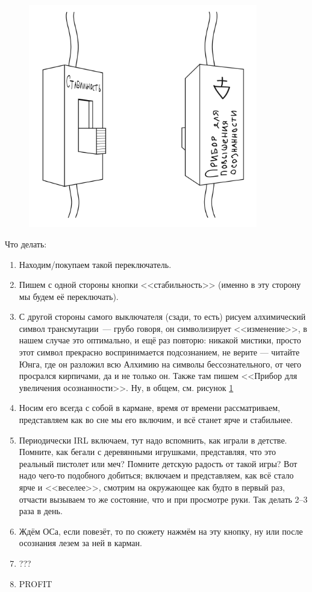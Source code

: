 \documentclass[a5paper,12pt,twoside]{memoir}
\begin{document}
\begin{figure}[h!]

\begin{center}
\includegraphics[width=10cm]{ris111.png}
\end{center}
\caption{}
\label{sitem}
\end{figure}

\clearpage

Что делать:
\begin{enumerate}
\item Находим/покупаем такой переключатель.
\item Пишем с одной стороны кнопки <<стабильность>> (именно в эту сторону мы будем её переключать).
\item С другой стороны самого выключателя (сзади, то есть) рисуем алхимический символ трансмутации~--- грубо говоря, он символизирует <<изменение>>, в нашем случае это оптимально, и ещё раз повторю: никакой мистики, просто этот символ прекрасно воспринимается подсознанием, не верите — читайте Юнга, где он разложил всю Алхимию на символы бессознательного, от чего просрался кирпичами, да и не только он. Также там пишем <<Прибор для увеличения осознанности>>. Ну, в общем, см. рисунок \ref{sitem} 
\item Носим его всегда с собой в кармане, время от времени рассматриваем, представляем как во сне мы его включим, и всё станет ярче и стабильнее. 
\item Периодически IRL включаем, тут надо вспомнить, как играли в детстве. Помните, как бегали с деревянными игрушками, представляя, что это реальный пистолет или меч? Помните детскую радость от такой игры? Вот надо чего-то подобного добиться; включаем и представляем, как всё стало ярче и <<веселее>>, смотрим на окружающее как будто в первый раз, отчасти вызываем то же состояние, что и при просмотре руки. Так делать 2--3 раза в день. 
\item Ждём ОСа, если повезёт, то по сюжету нажмём на эту кнопку, ну или после осознания лезем за ней в карман. 
\item ???
\item PROFIT
\end{enumerate}
\end{document}
